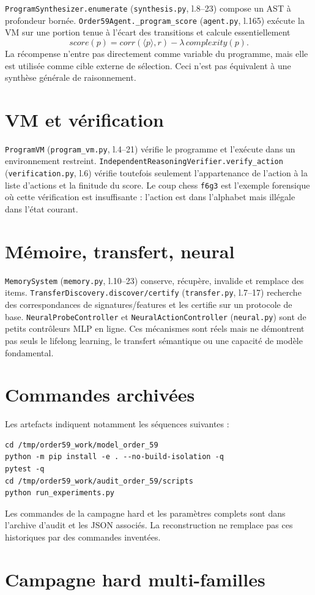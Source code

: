 \documentclass[11pt,a4paper]{article}
\begin{document}
\texttt{ProgramSynthesizer.enumerate} (\texttt{synthesis.py}, l.8--23) compose un AST à profondeur bornée. \texttt{Order59Agent.\_program\_score} (\texttt{agent.py}, l.165) exécute la VM sur une portion tenue à l'écart des transitions et calcule essentiellement
\[
score(p)=corr(\langle p\rangle, r)-\lambda\,complexity(p).
\]
La récompense n'entre pas directement comme variable du programme, mais elle est utilisée comme cible externe de sélection. Ceci n'est pas équivalent à une synthèse générale de raisonnement.\section{VM et vérification}
\texttt{ProgramVM} (\texttt{program\_vm.py}, l.4--21) vérifie le programme et l'exécute dans un environnement restreint. \texttt{IndependentReasoningVerifier.verify\_action} (\texttt{verification.py}, l.6) vérifie toutefois seulement l'appartenance de l'action à la liste d'actions et la finitude du score. Le coup chess \texttt{f6g3} est l'exemple forensique où cette vérification est insuffisante : l'action est dans l'alphabet mais illégale dans l'état courant.\section{Mémoire, transfert, neural}
\texttt{MemorySystem} (\texttt{memory.py}, l.10--23) conserve, récupère, invalide et remplace des items. \texttt{TransferDiscovery.discover/certify} (\texttt{transfer.py}, l.7--17) recherche des correspondances de signatures/features et les certifie sur un protocole de base. \texttt{NeuralProbeController} et \texttt{NeuralActionController} (\texttt{neural.py}) sont de petits contrôleurs MLP en ligne. Ces mécanismes sont réels mais ne démontrent pas seuls le lifelong learning, le transfert sémantique ou une capacité de modèle fondamental.\section{Commandes archivées}
Les artefacts indiquent notamment les séquences suivantes :
\begin{verbatim}
cd /tmp/order59_work/model_order_59
python -m pip install -e . --no-build-isolation -q
pytest -q
cd /tmp/order59_work/audit_order_59/scripts
python run_experiments.py
\end{verbatim}
Les commandes de la campagne hard et les paramètres complets sont dans l'archive d'audit et les JSON associés. La reconstruction ne remplace pas ces historiques par des commandes inventées.\section{Campagne hard multi-familles}
\end{document}
